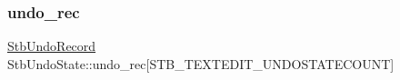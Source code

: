 \hypertarget{struct_stb_undo_state_a8cb07be8f304d1620b50bd024709023f}{}\label{struct_stb_undo_state_a8cb07be8f304d1620b50bd024709023f} 
\subsubsection{\texorpdfstring{undo\+\_\+rec}{undo\_rec}}
{\footnotesize\ttfamily \hyperlink{struct_stb_undo_record}{Stb\+Undo\+Record} Stb\+Undo\+State\+::undo\+\_\+rec\mbox{[}S\+T\+B\+\_\+\+T\+E\+X\+T\+E\+D\+I\+T\+\_\+\+U\+N\+D\+O\+S\+T\+A\+T\+E\+C\+O\+U\+NT\mbox{]}}

